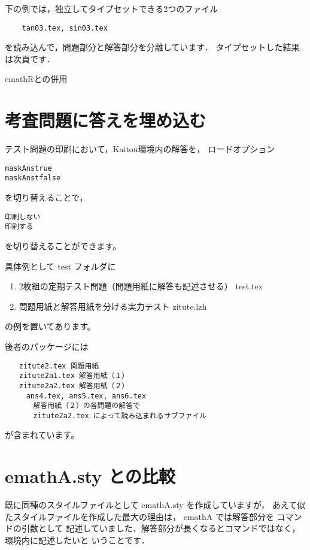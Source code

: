 \documentclass{jarticle}
\def\showExP#1#2{%
    \begin{itembox}{#1}
    
    \end{itembox}

\clearpage

    \begin{shadebox}
    \begin{minipage}[t][.98\textheight]{.98\linewidth}
    
    \end{minipage}
    \end{shadebox}
}%
\begin{document}
下の例では，独立してタイプセットできる2つのファイル
\begin{verbatim}
    tan03.tex, sin03.tex
\end{verbatim}
を読み込んで，問題部分と解答部分を分離しています．
タイプセットした結果は次頁です．

\showExP{\textsf{emathR}との併用}{example/ex03}

\section{考査問題に答えを埋め込む}
テスト問題の印刷において，\textsf{Kaitou}環境内の解答を，
ロードオプション
\begin{jquote}
\begin{verbatim}
maskAnstrue
maskAnstfalse
\end{verbatim}
\end{jquote}
を切り替えることで，
\begin{jquote}
\begin{verbatim}
印刷しない
印刷する
\end{verbatim}
\end{jquote}
を切り替えることができます。

具体例として test フォルダに
\begin{enumerate}[(1)]
  \item 2枚組の定期テスト問題（問題用紙に解答も記述させる） test.tex
  \item 問題用紙と解答用紙を分ける実力テスト zitute.lzh
\end{enumerate}
の例を置いてあります。

後者のパッケージには
\begin{jquote}
\begin{verbatim}
　　zitute2.tex 問題用紙
　　zitute2a1.tex 解答用紙（１）
　　zitute2a2.tex 解答用紙（２）
　　　ans4.tex, ans5.tex, ans6.tex
　　　　解答用紙（２）の各問題の解答で 
　　　　zitute2a2.tex によって読み込まれるサブファイル
\end{verbatim}
\end{jquote}
が含まれています。

\section{\textsf{emathA.sty} との比較}
既に同種のスタイルファイルとして \textsf{emathA.sty} を作成していますが，
あえて似たスタイルファイルを作成した最大の理由は，
\textsf{emathA} では解答部分を コマンドの引数として
記述していました．解答部分が長くなるとコマンドではなく，環境内に記述したいと
いうことです．
\end{document}
